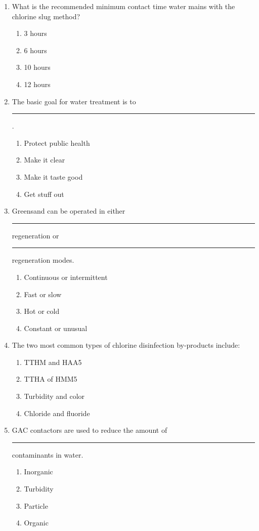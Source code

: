 \documentclass[10pt]{article}
\begin{document}
\begin{enumerate}
\begin{enumerate}
\item What is the recommended minimum contact time water mains with the chlorine slug method?
\begin{enumerate}
\item 3 hours
\item 6 hours
\item 10 hours
\item 12 hours
\end{enumerate}

\item The basic goal for water treatment is to \rule{2cm}{0.3pt}.
\begin{enumerate}
\item Protect public health
\item Make it clear
\item Make it taste good
\item Get stuff out
\end{enumerate}

\item Greensand can be operated in either \rule{2cm}{0.5pt} regeneration or \rule{2cm}{0.5pt} regeneration modes.
\begin{enumerate}
\item Continuous or intermittent
\item Fast or slow
\item Hot or cold
\item Constant or unusual
\end{enumerate}

\item The two most common types of chlorine disinfection by-products include:
\begin{enumerate}
\item TTHM and HAA5
\item TTHA of HMM5
\item Turbidity and color
\item Chloride and fluoride
\end{enumerate}

\item GAC contactors are used to reduce the amount of \rule{2cm}{0.5pt} contaminants in water.
\begin{enumerate}
\item Inorganic
\item Turbidity
\item Particle
\item Organic
\end{enumerate}


\end{enumerate}
\end{enumerate}
\end{document}

